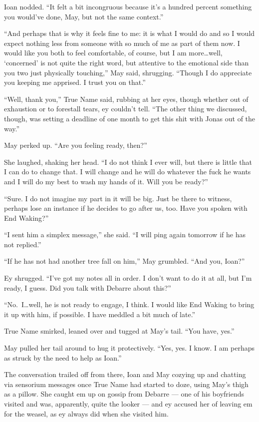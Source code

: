 Ioan nodded. ``It felt a bit incongruous because it's a hundred percent something you would've done, May, but not the same context.''

``And perhaps that is why it feels fine to me: it is what I would do and so I would expect nothing less from someone with so much of me as part of them now. I would like you both to feel comfortable, of course, but I am more\ldots well, `concerned' is not quite the right word, but attentive to the emotional side than you two just physically touching,'' May said, shrugging. ``Though I do appreciate you keeping me apprised. I trust you on that.''

``Well, thank you,'' True Name said, rubbing at her eyes, though whether out of exhaustion or to forestall tears, ey couldn't tell. ``The other thing we discussed, though, was setting a deadline of one month to get this shit with Jonas out of the way.''

May perked up. ``Are you feeling ready, then?''

She laughed, shaking her head. ``I do not think I ever will, but there is little that I can do to change that. I will change and he will do whatever the fuck he wants and I will do my best to wash my hands of it. Will you be ready?''

``Sure. I do not imagine my part in it will be big. Just be there to witness, perhaps lose an instance if he decides to go after us, too. Have you spoken with End Waking?''

``I sent him a simplex message,'' she said. ``I will ping again tomorrow if he has not replied.''

``If he has not had another tree fall on him,'' May grumbled. ``And you, Ioan?''

Ey shrugged. ``I've got my notes all in order. I don't want to do it at all, but I'm ready, I guess. Did you talk with Debarre about this?''

``No.~I\ldots well, he is not ready to engage, I think. I would like End Waking to bring it up with him, if possible. I have meddled a bit much of late.''

True Name smirked, leaned over and tugged at May's tail. ``You have, yes.''

May pulled her tail around to hug it protectively. ``Yes, yes. I know. I am perhaps as struck by the need to help as Ioan.''

The conversation trailed off from there, Ioan and May cozying up and chatting via sensorium messages once True Name had started to doze, using May's thigh as a pillow. She caught em up on gossip from Debarre — one of his boyfriends visited and was, apparently, quite the looker — and ey accused her of leaving em for the weasel, as ey always did when she visited him.

